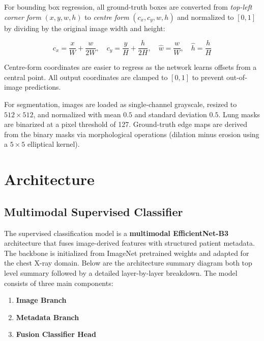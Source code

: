 For bounding box regression, all ground-truth boxes are converted from \emph{top-left corner form} $(x, y, w, h)$ to \emph{centre form} $(c_x, c_y, w, h)$ and normalized to $[0, 1]$ by dividing by the original image width and height:

\begin{equation}
c_x = \frac{x}{W} + \frac{w}{2W}, \quad c_y = \frac{y}{H} + \frac{h}{2H}, \quad \hat{w} = \frac{w}{W}, \quad \hat{h} = \frac{h}{H}
\end{equation}

Centre-form coordinates are easier to regress as the network learns offsets from a central point. All output coordinates are clamped to $[0,1]$ to prevent out-of-image predictions.

For segmentation, images are loaded as single-channel grayscale, resized to $512 \times 512$, and normalized with mean $0.5$ and standard deviation $0.5$. Lung masks are binarized at a pixel threshold of 127. Ground-truth edge maps are derived from the binary masks via morphological operations (dilation minus erosion using a $5 \times 5$ elliptical kernel).

\section{Architecture}

\subsection{Multimodal Supervised Classifier}

The supervised classification model is a \textbf{multimodal EfficientNet-B3} architecture that fuses image-derived features with structured patient metadata. The backbone is initialized from ImageNet pretrained weights and adapted for the chest X-ray domain. Below are the architecture summary diagram both top level summary followed by
a detailed layer-by-layer breakdown. The model consists of three main components: 
\begin{enumerate}
    \item \textbf{Image Branch} 
    \item \textbf{Metadata Branch}
    \item \textbf{Fusion Classifier Head}
\end{enumerate}
%   
%   
%   
%   
%   

